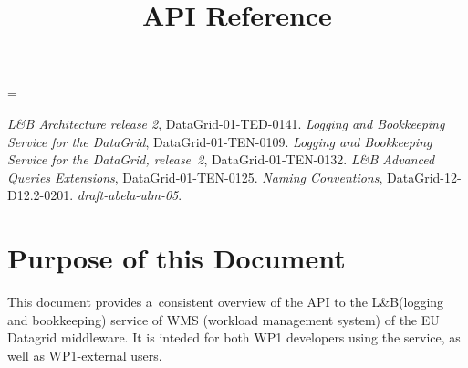 \documentclass{egee}
\title{\LB API Reference}
\def\LB{L\&B\xspace}
\begin{document}
\parindent=0pt
\parskip=\smallskipamount

\tableofcontents

\makeatletter
\def\jobid{\textit{JobId}\xspace}
\def\@tti[#1]{\item[{\normalfont\texttt{#1}}]\catcode`\_=8}
\def\tti{\catcode`\_=11\noexpand\@tti}
\newlength{\tw}

\def\synopsis{\catcode`\_=11\noexpand\@synopsis}
\def\@synopsis#1#2{
\tw=\linewidth
\advance\tw-2em
\texttt{#1(}\\
\strut\hskip2em\begin{tabularx}\tw{>{\begingroup\tt}l<{\endgroup}lX}
#2
\end{tabularx}\\
\texttt)
\catcode`\_=8
}

\def\Synopsis{\subsubsection*{Synopsis}}
\def\Description{\subsubsection*{Description}}
\def\Return{\subsubsection*{Return values}}

\begin{thebibliography}{9}
\emph{\LB Architecture release 2}, DataGrid-01-TED-0141.
\emph{Logging and Bookkeeping Service for the DataGrid},
DataGrid-01-TEN-0109.
\emph{Logging and Bookkeeping Service for the DataGrid, release~2},
DataGrid-01-TEN-0132.
\emph{\LB Advanced Queries Extensions},
DataGrid-01-TEN-0125.
\emph{Naming Conventions}, DataGrid-12-D12.2-0201.
\emph{draft-abela-ulm-05}.

\end{thebibliography}

\section*{Purpose of this Document}
This document provides a~consistent overview of the API to the \LB (logging and bookkeeping) service of WMS (workload management system) of the EU Datagrid
middleware.
It is inteded for both WP1 developers using the service,
as well as WP1-external users.
\end{document}
